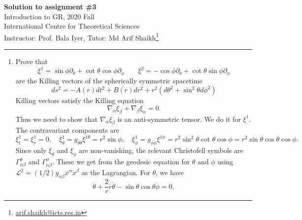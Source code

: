 \documentclass[fleqn]{article}
\begin{document}
\begin{center}
  {\bfseries Solution to assignment \#3}\\
  Introduction to GR, 2020 Fall\\
  International Centre for Theoretical Sciences\\
  Instructor: Prof. Bala Iyer, Tutor: Md Arif Shaikh\footnote{\href{mailto: arif.shaikh@icts.res.in}{arif.shaikh@icts.res.in}}\\
\end{center}
\hrule

\begin{enumerate}
\item[3.] Prove that
  \begin{equation}
    \label{eq:Killing-vectors-sph}
    \xi^{1} = \sin\phi\partial_\theta + \cot\theta\cos\phi\partial_\phi\qquad \xi^{2} = - \cos\phi\partial_\theta + \cot\theta\sin\phi\partial_\phi
  \end{equation}
  are the Killing vectors of the spherically symmetric spacetime
  \begin{equation}
    \label{eq:line-element-spherically-symmetric}
    ds^2 = -A(r)dt^2 + B(r)dr^2 + r^2 (d\theta^2 + \sin^2\theta d\phi^2)
  \end{equation}
   Killing vectors satisfy the Killing equation
  \begin{equation}
    \label{eq:Killing-equation}
    \nabla_\alpha \xi_\beta + \nabla_\beta \xi_\alpha = 0.
  \end{equation}
  Thus we need to show that $\nabla_\alpha\xi_\beta$ is an anti-symmetric tensor. We do it for $\xi^1$. The contravariant components are
  \begin{equation}
    \label{eq:contravariant-xi1}
    \xi^1_t = \xi^1_r = 0,\quad \xi^1_\theta = g_{\theta\theta}\xi^{1\theta} = r^2\sin\phi,\quad\xi^1_{\phi} = g_{\phi\phi}\xi^{1\phi} = r^2\sin^2\theta \cot\theta\cos\phi = r^2\sin\theta\cos\theta\cos\phi.
  \end{equation}
  Since only $\xi_\theta$ and $\xi_\phi$ are non-vanishing, the relevant Christofell symbols are $\Gamma^\theta_{\alpha\beta}$ and $\Gamma^\phi_{\alpha\beta}$. These we get from the geodesic equation for $\theta$ and $\phi$ using $\mathcal{L}^2 = (1/2)g_{\alpha\beta}\dot{x}^\alpha\dot{x}^\beta$ as the Lagrangian. For $\theta$, we have
  \begin{equation}
    \label{eq:theta-e-o-m}
    \ddot{\theta} + \frac{2}{r}\dot{r}\dot{\theta} - \sin\theta\cos\theta\ddot{\phi} = 0,
  \end{equation}

\end{enumerate}
\end{document}
